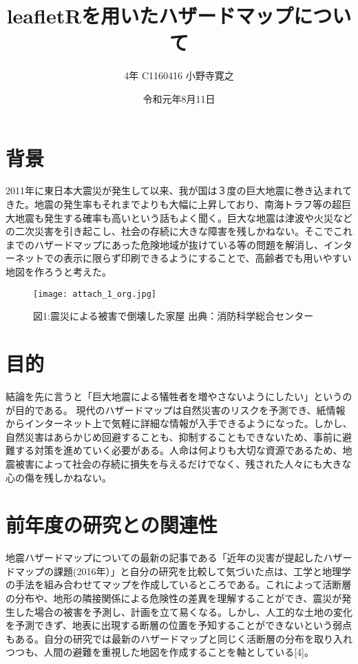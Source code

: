 \documentclass[report]{jsbook}
\title{leafletRを用いたハザードマップについて}
\author{4年 C1160416 小野寺寛之 \\
}
\date{令和元年8月11日}
\begin{document}
\onecolumn   
  \maketitle

  \tableofcontents
  \clearpage
\chapter{背景}
2011年に東日本大震災が発生して以来、我が国は３度の巨大地震に巻き込まれてきた。地震の発生率もそれまでよりも大幅に上昇しており、南海トラフ等の超巨大地震も発生する確率も高いという話もよく聞く。巨大な地震は津波や火災などの二次災害を引き起こし、社会の存続に大きな障害を残しかねない。そこでこれまでのハザードマップにあった危険地域が抜けている等の問題を解消し、インターネットでの表示に限らず印刷できるようにすることで、高齢者でも用いやすい地図を作ろうと考えた。
\begin{center}
   \begin{figure}[htp]
    \texttt{[image: attach\_1\_org.jpg]}
    \caption{図1:震災による被害で倒壊した家屋 出典：消防科学総合センター}
   \end{figure}
\end{center}

\chapter{目的}
結論を先に言うと「巨大地震による犠牲者を増やさないようにしたい」というのが目的である。
現代のハザードマップは自然災害のリスクを予測でき、紙情報からインターネット上で気軽に詳細な情報が入手できるようになった。しかし、自然災害はあらかじめ回避することも、抑制することもできないため、事前に避難する対策を進めていく必要がある。人命は何よりも大切な資源であるため、地震被害によって社会の存続に損失を与えるだけでなく、残された人々にも大きな心の傷を残しかねない。
\chapter{前年度の研究との関連性}
地震ハザードマップについての最新の記事である「近年の災害が提起したハザードマップの課題(2016年）」と自分の研究を比較して気づいた点は、工学と地理学の手法を組み合わせてマップを作成しているところである。これによって活断層の分布や、地形の隣接関係による危険性の差異を理解することができ、震災が発生した場合の被害を予測し、計画を立て易くなる。しかし、人工的な土地の変化を予測できず、地表に出現する断層の位置を予知することができないという弱点もある。自分の研究では最新のハザードマップと同じく活断層の分布を取り入れつつも、人間の避難を重視した地図を作成することを軸としている[4]。
\end{document}
